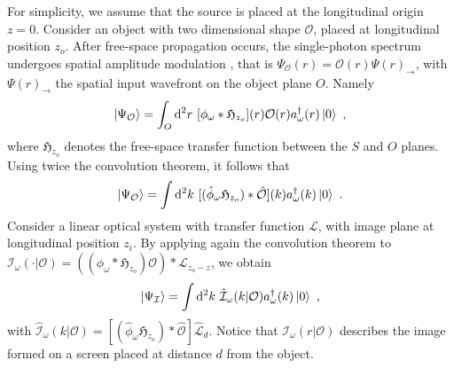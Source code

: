 \documentclass[reprint,
superscriptaddress,
nofootinbib,
aps,
pra,
showkeys
]{revtex4-2}
\newcommand*\dif{\mathop{}\!\mathrm{d}}
\newcommand{\I}{\mathcal{I}}
\renewcommand{\O}{\mathcal{O}}
\begin{document}
\begin{widetext}
For simplicity, we assume that the source is placed at the longitudinal origin $z = 0$. Consider an object with two dimensional shape $\O$, placed at longitudinal position $z_o$. After free-space propagation occurs, the single-photon spectrum undergoes spatial amplitude modulation \citep{book:Saleh}, that is $\Psi_{\O}(r) = \O(r) \Psi(r)_{\to}$, with $\Psi(r)_{\to}$ the spatial input wavefront on the object plane $O$. Namely
\begin{equation}
	\ket{\Psi_{\O}} = \int_O \dif^2r \ [\phi_\omega*\mathfrak{H}_{z_o}](r)\O(r) a^{\dagger}_{\omega}(r)\ket{0} \ ,
	\label{eq:ObjectTransfer}
\end{equation}
where $\mathfrak{H}_{z_o}$ denotes the free-space transfer function between the $S$ and $O$ planes. Using twice the convolution theorem, it follows that 
\begin{equation}
	\ket{\Psi_{\O}} = \int \dif^2k \ [(\hat{\phi}_\omega \mathfrak{H}_{z_o})*\hat{\O}](k) a^{\dagger}_\omega(k) \ket{0} \ .
\end{equation}
Consider a linear optical system with transfer function $\mathcal{L}$, with image plane at longitudinal position $z_i$. By applying again the convolution theorem to $\I_\omega(\cdot|\O) = \left((\phi_\omega*\mathfrak{H}_{z_o}) \O \right)*\mathcal{L}_{z_o - z}$, we obtain
\begin{equation}
	\ket{\Psi_\I} = \int \dif^2k \ \hat{\I}_\omega(k | \O) a^\dagger_\omega(k) \ket{0} \ ,
\end{equation}
with $\hat{\I}_\omega(k|\O) = [(\hat{\phi}_\omega \mathfrak{H}_{z_o})*\hat{\O}] \hat{\mathcal{L}}_{d}$. Notice that $\I_\omega(r|\O)$ describes the image formed on a screen placed at distance $d$ from the object.


\end{widetext}
\end{document}
